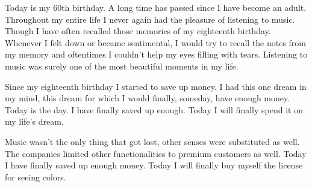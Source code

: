 \documentclass[11pt,paper=a5,pagesize,english,openright,twoside]{scrbook}
\newcommand{\pc}[1]{{\fontspec{OCRA}\scriptsize \addfontfeature{LetterSpace=-12.0,WordSpace=.7}{#1}}}
\begin{document}
Today is my 60th birthday. A long time has passed since I have become an
adult. Throughout my entire life I never again had the pleasure of
listening to music. Though I have often recalled those memories of my
eighteenth birthday. Whenever I felt down or became sentimental, I would
try to recall the notes from my memory and oftentimes I couldn't help my
eyes filling with tears. Listening to music was surely one of the most 
beautiful moments in my life.

Since my eighteenth birthday I started to save up money. I had this
one dream in my mind, this dream for which I would finally, someday, have 
enough money. Today is the day. I have finally saved up enough. 
Today I will finally spend it on my life's dream. 

Music wasn't the only thing that got lost, other senses were substituted as well. 
The companies limited other functionalities to premium customers as well.
Today I have finally saved up enough money. Today I will finally buy 
myself the license for seeing colors.



\clearpage
\thispagestyle{empty}

\ \\
\vspace{8cm}\\

\newpage
\thispagestyle{empty}
\
\newpage
\thispagestyle{empty}
\
\newpage




\thispagestyle{empty}


%
\end{document}
